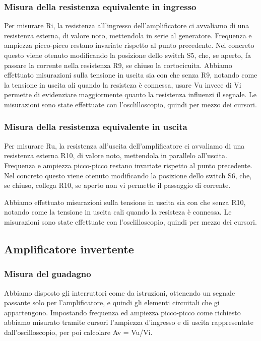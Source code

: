 \documentclass[a4paper]{article}
\begin{document}
			\subsubsection{Misura della resistenza equivalente in ingresso}
				Per misurare Ri, la resistenza all'ingresso dell'amplificatore ci avvaliamo di una resistenza esterna, di valore noto, mettendola in serie al generatore.
				Frequenza e ampiezza picco-picco restano invariate rispetto al punto precedente. 
				Nel concreto questo viene otenuto modificando la  posizione dello switch S5, che, se aperto, fa passare la corrente nella resistenza R9, se chiuso la cortocicuita.
				Abbiamo effettuato misurazioni sulla tensione in uscita sia con che senza R9, notando come la tensione in uscita ali quando la resisteza è connessa, usare Vu invece di Vi permette di evidenziare maggiormente quanto la resistenza influenzi il segnale. %
				Le misurazioni sono state effettuate con l'osclilloscopio, quindi per mezzo dei cursori.
			\subsubsection{Misura della resistenza equivalente in uscita}	
				Per misurare Ru, la resistenza all'uscita dell'amplificatore ci avvaliamo di una resistenza esterna R10, di valore noto, mettendola in parallelo all'uscita.
				Frequenza e ampiezza picco-picco restano invariate rispetto al punto precedente. 
				Nel concreto questo viene otenuto modificando la  posizione dello switch S6, che, se chiuso, collega R10, se aperto non vi permette il passaggio di corrente.
				
				Abbiamo effettuato misurazioni sulla tensione in uscita sia con che senza R10, notando come la tensione in uscita cali quando la resisteza è connessa. %
				Le misurazioni sono state effettuate con l'osclilloscopio, quindi per mezzo dei cursori.
				
		\subsection{Amplificatore invertente}
			\subsubsection{Misura del guadagno}
				Abbiamo disposto gli interruttori come da istruzioni, ottenendo un segnale passante solo per l'amplificatore, e quindi gli elementi circuitali che gi appartengono. %
				Impostando frequenza ed ampiezza picco-picco come richiesto abbiamo misurato tramite cursori l'ampiezza d'ingresso e di uscita rappresentate dall'oscilloscopio, per poi calcolare Av = Vu/Vi.
\end{document}
